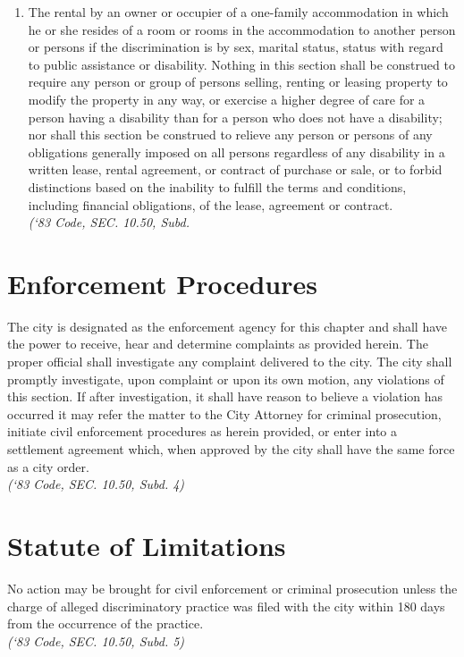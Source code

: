 \documentclass[code.tex]{subfiles}
\begin{document}
\begin{enumerate}[{\indent}A)]
\begin{enumerate}
\item The rental by an owner or occupier of a one-family accommodation in which he or she resides of a room or rooms in the accommodation to another person or persons if the discrimination is by sex, marital status, status with regard to public assistance or disability. Nothing in this section shall be construed to require any person or group of persons selling, renting or leasing property to modify the property in any way, or exercise a higher degree of care for a person having a disability than for a person who does not have a disability; nor shall this section be construed to relieve any person or persons of any obligations generally imposed on all persons regardless of any disability in a written lease, rental agreement, or contract of purchase or sale, or to forbid distinctions based on the inability to fulfill the terms and conditions, including financial obligations, of the lease, agreement or contract.\\
\emph{(‘83 Code, SEC. 10.50, Subd.}
\end{enumerate}
\end{enumerate}

\section{Enforcement Procedures}
The city is designated as the enforcement agency for this chapter and shall have the power to receive, hear and determine complaints as provided herein. The proper official shall investigate any complaint delivered to the city. The city shall promptly investigate, upon complaint or upon its own motion, any violations of this section.  If after investigation, it shall have reason to believe a violation has occurred it may refer the matter to the City Attorney for criminal prosecution, initiate civil enforcement procedures as herein provided, or enter into a settlement agreement which, when approved by the city shall have the same force as a city order.\\
\emph{(‘83 Code, SEC. 10.50, Subd. 4)}

\section{Statute of Limitations}
No action may be brought for civil enforcement or criminal prosecution unless the charge of alleged discriminatory practice was filed with the city within 180 days from the occurrence of the practice.\\
\emph{(‘83 Code, SEC. 10.50, Subd. 5)}
\end{document}
